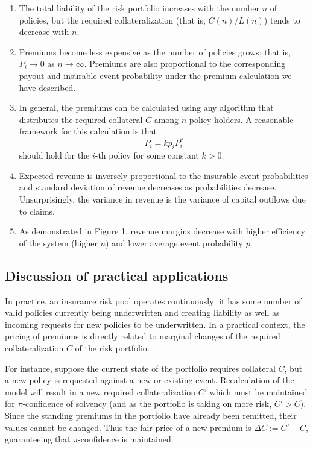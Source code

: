 \documentclass[12pt]{article}
\begin{document}
\begin{enumerate}
    \item The total liability of the risk portfolio increases with the number $n$ of policies, but the required collateralization (that is, $C(n)/L(n)$) tends to decrease with $n$.
    \item Premiums become less expensive as the number of policies grows; that is, $P_i\to 0$ as $n\to\infty$. Premiums are also proportional to the corresponding payout and insurable event probability under the premium calculation we have described.
    \item In general, the premiums can be calculated using any algorithm that distributes the required collateral $C$ among $n$ policy holders. A reasonable framework for this calculation is that $$P_i = kp_iP_i^*$$ should hold for the $i$-th policy for some constant $k > 0$.
    \item Expected revenue is inversely proportional to the insurable event probabilities and standard deviation of revenue decreases as probabilities decrease. Unsurprisingly, the variance in revenue is the variance of capital outflows due to claims.
    \item As demonstrated in Figure 1, revenue margins decrease with higher efficiency of the system (higher $n$) and lower average event probability $p$.
\end{enumerate}

\subsection{Discussion of practical applications}

In practice, an insurance risk pool operates continuously: it has some number of valid policies currently being underwritten and creating liability as well as incoming requests for new policies to be underwritten. In a practical context, the pricing of premiums is directly related to marginal changes of the required collateralization $C$ of the risk portfolio.

For instance, suppose the current state of the portfolio requires collateral $C$, but a new policy is requested against a new or existing event. Recalculation of the model will result in a new required collateralization $C'$ which must be maintained for $\pi$-confidence of solvency (and as the portfolio is taking on more risk, $C'>C$). Since the standing premiums in the portfolio have already been remitted, their values cannot be changed. Thus the fair price of a new premium is $\Delta C := C' - C$, guaranteeing that $\pi$-confidence is maintained.
\end{document}
